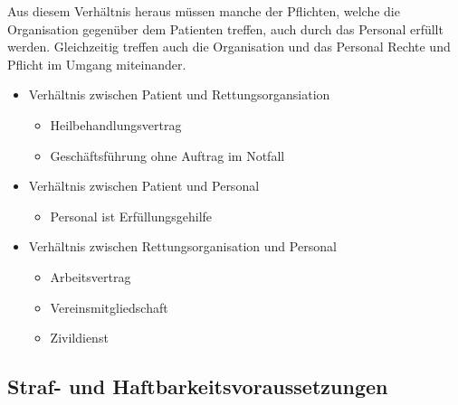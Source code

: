 {Aus diesem Verhältnis heraus müssen manche der Pflichten,
welche die Organisation gegenüber dem Patienten treffen,
auch durch das Personal erfüllt werden. Gleichzeitig treffen
auch die Organisation und das Personal Rechte und Pflicht im
Umgang miteinander.
}{
\begin{itemize}
  \item Verhältnis zwischen Patient und Rettungsorgansiation
  \begin{itemize}
    \item Heilbehandlungsvertrag
    \item Geschäftsführung ohne Auftrag im Notfall
  \end{itemize}
  \item Verhältnis zwischen Patient und Personal
  \begin{itemize}
    \item Personal ist Erfüllungsgehilfe
  \end{itemize}
  \item Verhältnis zwischen Rettungsorganisation und
  Personal
  \begin{itemize}
    \item Arbeitsvertrag
    \item Vereinsmitgliedschaft
    \item Zivildienst
  \end{itemize}
\end{itemize}
}{}{}{}

\subsection{Straf- und Haftbarkeitsvoraussetzungen}
\label{topic:strafbarkeitspruefung}
\label{topic:haftbarkeitspruefung}
\label{topic:strafbarkeitsvoraussetzung}
\label{topic:haftbarkeitsvoraussetzung}




